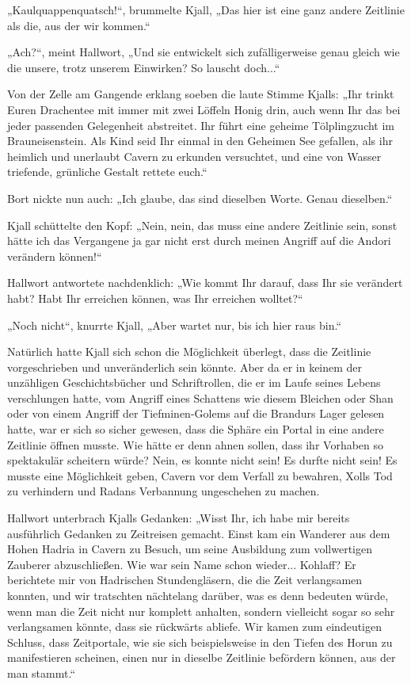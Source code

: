 \documentclass[10pt, a4paper, oneside]{book}
\begin{document}
„Kaulquappenquatsch!“, brummelte Kjall, „Das hier ist eine ganz andere Zeitlinie als die, aus der wir kommen.“

„Ach?“, meint Hallwort, „Und sie entwickelt sich zufälligerweise genau gleich wie die unsere, trotz unserem Einwirken? So lauscht doch...“

Von der Zelle am Gangende erklang soeben die laute Stimme Kjalls: „Ihr trinkt Euren Drachentee mit immer mit zwei Löffeln Honig drin, auch wenn Ihr das bei jeder passenden Gelegenheit abstreitet. Ihr führt eine geheime Tölplingzucht im Brauneisenstein. Als Kind seid Ihr einmal in den Geheimen See gefallen, als ihr heimlich und unerlaubt Cavern zu erkunden versuchtet, und eine von Wasser triefende, grünliche Gestalt rettete euch.“

Bort nickte nun auch: „Ich glaube, das sind dieselben Worte. Genau dieselben.“

Kjall schüttelte den Kopf: „Nein, nein, das muss eine andere Zeitlinie sein, sonst hätte ich das Vergangene ja gar nicht erst durch meinen Angriff auf die Andori verändern können!“

Hallwort antwortete nachdenklich: „Wie kommt Ihr darauf, dass Ihr sie verändert habt? Habt Ihr erreichen können, was Ihr erreichen wolltet?“

„Noch nicht“, knurrte Kjall, „Aber wartet nur, bis ich hier raus bin.“

Natürlich hatte Kjall sich schon die Möglichkeit überlegt, dass die Zeitlinie vorgeschrieben und unveränderlich sein könnte. Aber da er in keinem der unzähligen Geschichtsbücher und Schriftrollen, die er im Laufe seines Lebens verschlungen hatte, vom Angriff eines Schattens wie diesem Bleichen oder Shan oder von einem Angriff der Tiefminen-Golems auf die Brandurs Lager gelesen hatte, war er sich so sicher gewesen, dass die Sphäre ein Portal in eine andere Zeitlinie öffnen musste. Wie hätte er denn ahnen sollen, dass ihr Vorhaben so spektakulär scheitern würde? Nein, es konnte nicht sein! Es durfte nicht sein! Es musste eine Möglichkeit geben, Cavern vor dem Verfall zu bewahren, Xolls Tod zu verhindern und Radans Verbannung ungeschehen zu machen.

Hallwort unterbrach Kjalls Gedanken: „Wisst Ihr, ich habe mir bereits ausführlich Gedanken zu Zeitreisen gemacht. Einst kam ein Wanderer aus dem Hohen Hadria in Cavern zu Besuch, um seine Ausbildung zum vollwertigen Zauberer abzuschließen. Wie war sein Name schon wieder... Kohlaff? Er berichtete mir von Hadrischen Stundengläsern, die die Zeit verlangsamen konnten, und wir tratschten nächtelang darüber, was es denn bedeuten würde, wenn man die Zeit nicht nur komplett anhalten, sondern vielleicht sogar so sehr verlangsamen könnte, dass sie rückwärts abliefe. Wir kamen zum eindeutigen Schluss, dass Zeitportale, wie sie sich beispielsweise in den Tiefen des Horun zu manifestieren scheinen, einen nur in dieselbe Zeitlinie befördern können, aus der man stammt.“
\end{document}
